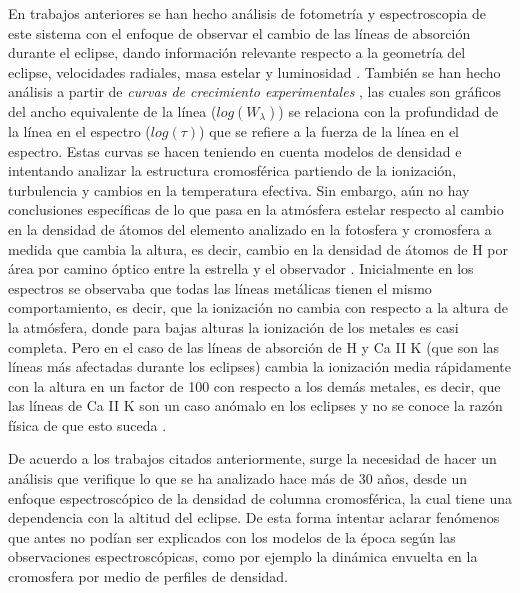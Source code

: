 \documentclass[11pt]{article}
\begin{document}
\noindent En trabajos anteriores se han hecho análisis de fotometría y espectroscopia de este sistema con el enfoque de observar el cambio de las líneas de absorción durante el eclipse, dando información relevante respecto a la geometría del eclipse, velocidades radiales, masa estelar y luminosidad \cite{kps9}. También se han hecho análisis a partir de \textit{curvas de crecimiento experimentales} \cite{complete}, las cuales son gráficos del ancho equivalente de la línea ($log(W_{\lambda})$) se relaciona con la profundidad de la línea en el espectro ($log(\tau)$) que se refiere a la fuerza de la línea en el espectro. Estas curvas se hacen teniendo en cuenta modelos de densidad e intentando analizar la estructura cromosférica partiendo de la ionización, turbulencia y cambios en la temperatura efectiva. Sin embargo, aún no hay conclusiones específicas de lo que pasa en la atmósfera estelar respecto al cambio en la densidad de átomos del elemento analizado en la fotosfera y cromosfera a medida que cambia la altura, es decir, cambio en la densidad de átomos de H por área por camino óptico entre la estrella y el observador \cite{rybicki2008radiative}. Inicialmente en los espectros se observaba que todas las líneas metálicas tienen el mismo comportamiento, es decir, que la ionización no cambia con respecto a la altura de la atmósfera, donde para bajas alturas la ionización de los metales es casi completa. Pero en el caso de  las líneas de absorción de H y Ca II K (que son las líneas más afectadas durante los eclipses) cambia la ionización media rápidamente con la altura en un factor de 100 con respecto a los demás metales, es decir, que las líneas de Ca II K son un caso anómalo en los eclipses y no se conoce la razón física de que esto suceda \cite{complete}.

\noindent De acuerdo a los trabajos citados anteriormente, surge la necesidad de hacer un análisis que verifique lo que se ha analizado hace más de 30 años, desde un  enfoque espectroscópico de la densidad de columna cromosférica, la cual tiene una dependencia con la altitud del eclipse. De esta forma intentar aclarar fenómenos que antes no podían ser explicados con los modelos de la época según las observaciones espectroscópicas, como por ejemplo la dinámica envuelta en la cromosfera por medio de perfiles de densidad. 
\end{document}
